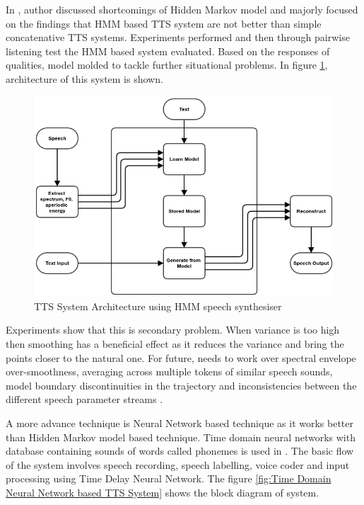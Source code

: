 In \cite{merritt2013investigating}, author discussed shortcomings of Hidden Markov model and majorly focused on the findings that HMM based TTS system are not better than simple concatenative TTS systems. Experiments performed and then through pairwise listening test the HMM based system evaluated. Based on the responses of qualities, model molded to tackle further situational problems. In figure \ref{fig:Merritt_tts}, architecture of this system is shown.
\begin{center}
	\begin{figure}[hbtp]
		\centering
		\includegraphics[width=\linewidth]{images/Merritt_tts.png}
		\caption{TTS System Architecture using HMM speech synthesiser}
		\label{fig:Merritt_tts}
	\end{figure}
\end{center}

Experiments show that this is secondary problem. When variance is too high then smoothing has a beneficial effect as it
reduces the variance and bring the points closer to the natural one. For future, needs to work over spectral envelope over-smoothness, averaging across multiple tokens of similar speech sounds, model boundary discontinuities in the trajectory and
inconsistencies between the different speech parameter streams \cite{merritt2013investigating}.

A more advance technique is Neural Network based technique as it works better than Hidden
Markov model based technique. Time domain neural networks with
database containing sounds of words called phonemes is used in \cite{karaali1998text}. The basic flow of the system involves
speech recording, speech labelling, voice coder and input processing using Time Delay Neural
Network. The figure \ref{fig:Time Domain Neural Network based TTS System} shows the block diagram of system.

